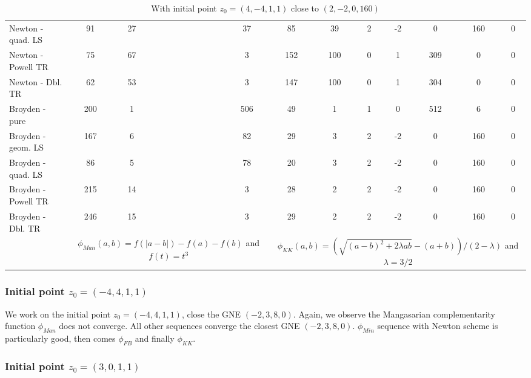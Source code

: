 \documentclass[11pt]{article}
\begin{document}
\begin{table}[htb!]
\begin{scriptsize}
\begin{tabular}{l|ccccccc|ccccccc}
Newton - quad. LS  &   91  &  27  &    &    &    &    &  37  &  85  &  39  &  2  &  -2  &  0  &  160  &  0 \\ 
Newton - Powell TR  &   75  &  67  &    &    &    &    &  3  &  152  &  100  &  0  &  1  &  309  &  0  &  0 \\ 
Newton - Dbl. TR  &   62  &  53  &    &    &    &    &  3  &  147  &  100  &  0  &  1  &  304  &  0  &  0 \\ 
Broyden - pure  &   200  &  1  &    &    &    &    &  506  &  49  &  1  &  1  &  0  &  512  &  6  &  0 \\ 
Broyden - geom. LS  &   167  &  6  &    &    &    &    &  82  &  29  &  3  &  2  &  -2  &  0  &  160  &  0 \\ 
Broyden - quad. LS  &   86  &  5  &    &    &    &    &  78  &  20  &  3  &  2  &  -2  &  0  &  160  &  0 \\ 
Broyden - Powell TR  &   215  &  14  &    &    &    &    &  3  &  28  &  2  &  2  &  -2  &  0  &  160  &  0 \\ 
Broyden - Dbl. TR  &   246  &  15  &    &    &    &    &  3  &  29  &  2  &  2  &  -2  &  0  &  160  &  0 \\ 
\hline
& \multicolumn{7}{c|}{$\phi_{Man}(a,b)=f(|a-b|) - f(a) - f(b)$ and $f(t)=t^3$} & 
\multicolumn{7}{c}{$\phi_{KK}(a,b)= (\sqrt{(a-b)^2+2\lambda a b} -(a+b))/(2-\lambda)$ and $\lambda=3/2$} \\
\end{tabular}
\end{scriptsize}

\caption{With initial point $z_0 = (4, -4,  1,  1)$ close to $(2, -2, 0, 160)$}
\label{bench4m411}

\end{table}


\subsubsection{Initial point $z_0 = (-4, 4,  1,  1)$}

We work on the initial point $z_0 = (-4, 4,  1,  1)$, close the GNE  $(-2, 3, 8, 0)$.
Again, we observe the Mangasarian complementarity function $\phi_{Man}$ does not converge. All other sequences converge the closest GNE $(-2, 3, 8, 0)$. $\phi_{Min}$ sequence with Newton scheme is particularly good, then comes $\phi_{FB}$ and finally $\phi_{KK}$.





\subsubsection{Initial point $z_0 = (3, 0,  1,  1)$}
\end{document}
